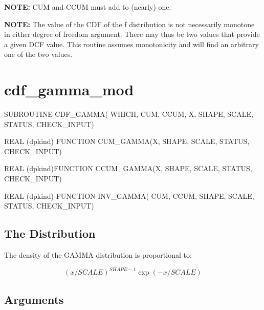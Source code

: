\documentclass[12pt,dvips]{article}
\newcommand{\mysection}[1]{\color{blue}
             \section{#1} \normalcolor}
\newcommand{\mysubsection}[1] {\color{green}
             \subsection{#1} \normalcolor}
\begin{document}
{\bf NOTE:} CUM and CCUM  must add to (nearly) one.

{\bf  NOTE:}  The  value  of  the  CDF of the  f  distribution  is  not
necessarily monotone in either  degree of freedom argument.  There may
thus  be two  values that  provide a  given DCF  value.   This routine
assumes monotonicity and will find an arbitrary one of the two values.

\pagebreak

\mysection{cdf\_gamma\_mod}

\begin{description}

\item SUBROUTINE CDF\_GAMMA( WHICH, CUM, CCUM, X, SHAPE, SCALE,
STATUS, CHECK\_INPUT)

\item    REAL   (dpkind)   FUNCTION    CUM\_GAMMA(X,
SHAPE, SCALE, STATUS, CHECK\_INPUT)

\item    REAL    (dpkind)FUNCTION    CCUM\_GAMMA(X,
SHAPE, SCALE, STATUS, CHECK\_INPUT)

\item  REAL (dpkind) FUNCTION  INV\_GAMMA(  CUM, CCUM,
SHAPE, SCALE, STATUS, CHECK\_INPUT)

\end{description}

\mysubsection{The Distribution}

The density of the GAMMA distribution is proportional to:

\[ (x/SCALE)^{SHAPE-1} \exp(-x/SCALE) \]

\mysubsection{Arguments}
\end{document}
